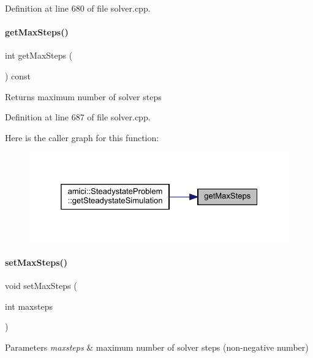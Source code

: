 Definition at line 680 of file solver.\+cpp.

\mbox{\label{classamici_1_1_solver_acf39690ae4c940c7734fc3fadabb4d50}} 
\paragraph{\texorpdfstring{getMaxSteps()}{getMaxSteps()}}
{\footnotesize\ttfamily int get\+Max\+Steps (\begin{DoxyParamCaption}{ }\end{DoxyParamCaption}) const}

\begin{DoxyReturn}{Returns}
maximum number of solver steps 
\end{DoxyReturn}


Definition at line 687 of file solver.\+cpp.

Here is the caller graph for this function\+:
\nopagebreak
\begin{figure}[H]
\begin{center}
\leavevmode
\includegraphics[width=325pt]{classamici_1_1_solver_acf39690ae4c940c7734fc3fadabb4d50_icgraph}
\end{center}
\end{figure}
\mbox{\label{classamici_1_1_solver_ab321627a9f9d22013638e0eb9b14d2dc}} 
\paragraph{\texorpdfstring{setMaxSteps()}{setMaxSteps()}}
{\footnotesize\ttfamily void set\+Max\+Steps (\begin{DoxyParamCaption}\item[{int}]{maxsteps }\end{DoxyParamCaption})}


\begin{DoxyParams}{Parameters}
{\em maxsteps} & maximum number of solver steps (non-\/negative number) \\
\hline
\end{DoxyParams}


